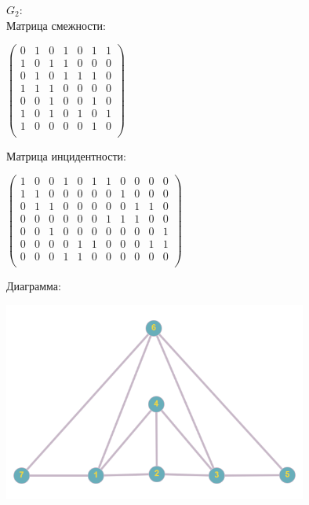 \documentclass[a4paper,14pt]{extarticle}
\begin{document}
\begin{enumerate}[1.]
          $G_2$:\\
          Матрица смежности:\\
          \begin{center}
              $\begin{pmatrix}
                      0 & 1 & 0 & 1 & 0 & 1 & 1 \\
                      1 & 0 & 1 & 1 & 0 & 0 & 0 \\
                      0 & 1 & 0 & 1 & 1 & 1 & 0 \\
                      1 & 1 & 1 & 0 & 0 & 0 & 0 \\
                      0 & 0 & 1 & 0 & 0 & 1 & 0 \\
                      1 & 0 & 1 & 0 & 1 & 0 & 1 \\
                      1 & 0 & 0 & 0 & 0 & 1 & 0 \\
                  \end{pmatrix}$
          \end{center}
          \bigbreak
          \setcounter{MaxMatrixCols}{20}
          Матрица инцидентности:\\
          \begin{center}
              $\begin{pmatrix}
                      1 & 0 & 0 & 1 & 0 & 1 & 1 & 0 & 0 & 0 & 0 \\
                      1 & 1 & 0 & 0 & 0 & 0 & 0 & 1 & 0 & 0 & 0 \\
                      0 & 1 & 1 & 0 & 0 & 0 & 0 & 0 & 1 & 1 & 0 \\
                      0 & 0 & 0 & 0 & 0 & 0 & 1 & 1 & 1 & 0 & 0 \\
                      0 & 0 & 1 & 0 & 0 & 0 & 0 & 0 & 0 & 0 & 1 \\
                      0 & 0 & 0 & 0 & 1 & 1 & 0 & 0 & 0 & 1 & 1 \\
                      0 & 0 & 0 & 1 & 1 & 0 & 0 & 0 & 0 & 0 & 0 \\
                  \end{pmatrix}$
          \end{center}\bigbreak
          Диаграмма:\\
          \begin{center}
              \includegraphics[width=100mm]{G2diagram}

\end{center}
\end{enumerate}
\end{document}
